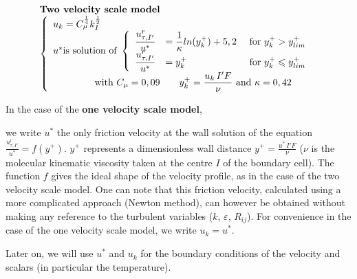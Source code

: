 \begin{equation}\label{Base_Clptur_Eq_Mod_'2ech_Vit}
\begin{array}{l}
\text{\bf Two velocity scale model}\\
\left\{\begin{array}{l}
u_k = C_\mu^\frac{1}{4}k_I^\frac{1}{2}\\
u^* \text{is solution of }
\left\{\begin{array}{lll}
\displaystyle\frac{u^r_{\tau,I'}}{u^*} &=
\displaystyle\frac{1}{\kappa}ln(y^+_k)+5,2 &\text { for }y^+_k>y^+_{lim}\\
\displaystyle\frac{u^r_{\tau,I'}}{u^*} &= y^+_k                &\text { for }
y^+_k \leqslant y^+_{lim}
\end{array}\right.    \\
\qquad\qquad
\text{   with   } C_\mu =0,09\qquad y^+_k=\displaystyle\frac{u_k\,I'F}{\nu}
                                                      \text{  and }\kappa = 0,42
\end{array}\right.
\end{array}
\end{equation}



In the case of the {\bf one velocity scale model},

we write $u^*$ the only 
friction velocity at the wall solution of the equation 
$\displaystyle\frac{u^r_{\tau,I'}}{u^*} = f(y^+)$. 
$y^+$  represents a dimensionless wall distance 
$y^+=\displaystyle\frac{u^*\,I'F}{\nu}$ ($\nu$ is the molecular kinematic viscosity 
taken at the centre $I$ of the boundary cell).
The function $f$ gives the ideal shape of the velocity profile, as in the case of the two velocity scale model. One can note that this friction velocity, calculated using a more complicated approach (Newton method), can however be obtained without making any reference to the turbulent variables ($k$, $\varepsilon$, $R_{ij}$). For convenience in the case of the one velocity scale model, we write $u_k=u^*$.

Later on, we will use $u^*$ and $u_k$ for the boundary conditions of the velocity and scalars (in particular the temperature).

